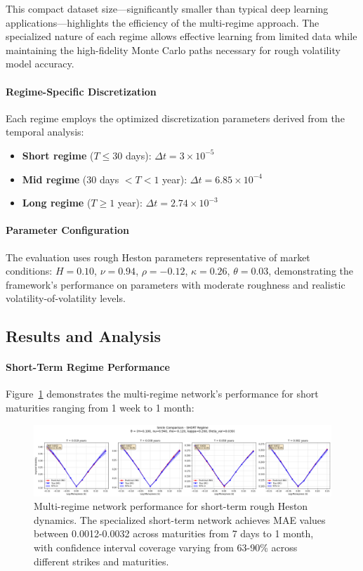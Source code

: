 	
	This compact dataset size—significantly smaller than typical deep learning applications—highlights the efficiency of the multi-regime approach. The specialized nature of each regime allows effective learning from limited data while maintaining the high-fidelity Monte Carlo paths necessary for rough volatility model accuracy.
	
	\paragraph{Regime-Specific Discretization}
	Each regime employs the optimized discretization parameters derived from the temporal analysis:
	\begin{itemize}[nosep]
		\item \textbf{Short regime} ($T \leq 30$ days): $\Delta t = 3 \times 10^{-5}$
		\item \textbf{Mid regime} (30 days $< T < 1$ year): $\Delta t = 6.85 \times 10^{-4}$
		\item \textbf{Long regime} ($T \geq 1$ year): $\Delta t = 2.74 \times 10^{-3}$
	\end{itemize}
	
	\paragraph{Parameter Configuration}
	The evaluation uses rough Heston parameters representative of market conditions:
	$H = 0.10$, $\nu = 0.94$, $\rho = -0.12$, $\kappa = 0.26$, $\theta = 0.03$, demonstrating the framework's performance on parameters with moderate roughness and realistic volatility-of-volatility levels.
	
	\subsection{Results and Analysis}
	
	\paragraph{Short-Term Regime Performance}
	
	Figure~\ref{fig:multiregime-short} demonstrates the multi-regime network's performance for short maturities ranging from 1 week to 1 month:
	
	\begin{figure}[ht]
		\centering
		\includegraphics[width=\textwidth]{../images/smile_comparison_short_regime.png}
		\caption{Multi-regime network performance for short-term rough Heston dynamics. The specialized short-term network achieves MAE values between 0.0012-0.0032 across maturities from 7 days to 1 month, with confidence interval coverage varying from 63-90\% across different strikes and maturities.}
		\label{fig:multiregime-short}
	\end{figure}
	
